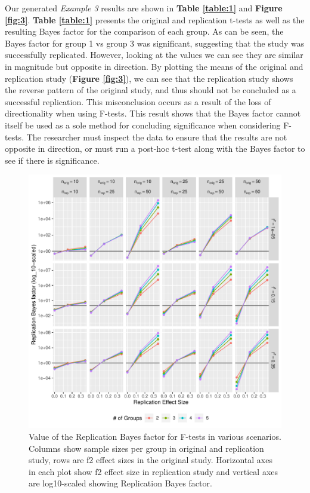 \documentclass[11pt]{article}
\begin{document}
Our generated \textit{Example 3} results are shown in \textbf{Table \ref{table:1}} and \textbf{Figure \ref{fig:3}}. \textbf{Table \ref{table:1}} presents the original and replication t-tests as well as the resulting Bayes factor for the comparison of each group. As can be seen, the Bayes factor for group 1 vs group 3 was significant, suggesting that the study was successfully replicated. However, looking at the values we can see they are similar in magnitude but opposite in direction. By plotting the means of the original and replication study (\textbf{Figure \ref{fig:3}}), we can see that the replication study shows the reverse pattern of the original study, and thus should not be concluded as a successful replication. This misconclusion occurs as a result of the loss of directionality when using F-tests. This result shows that the Bayes factor cannot itself be used as a sole method for concluding significance when considering F-tests. The researcher must inspect the data to ensure that the results are not opposite in direction, or must run a post-hoc t-test along with the Bayes factor to see if there is significance. 
\begin{figure}[H]
    \centering
        \includegraphics[scale=0.8]{figures/Group_9_Figure_1.pdf}
    \caption{Value of the Replication Bayes factor for F-tests in various scenarios. Columns show sample sizes per group in original and replication study, rows are f2 effect sizes in the original study. Horizontal axes in each plot show f2 effect size in replication study and vertical axes are log10-scaled showing Replication Bayes factor.}  
    \label{fig:1}
\end{figure}
\end{document}
